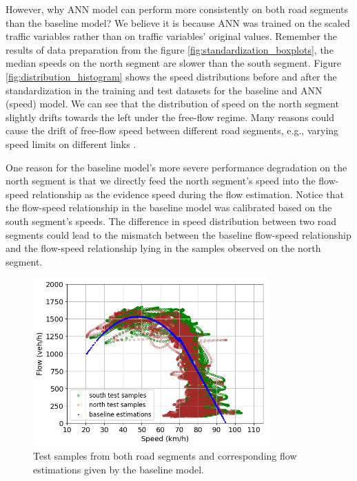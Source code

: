 \documentclass[english]{kththesis}
\begin{document}
However, why ANN model can perform more consistently on both road segments than the baseline model? We believe it is because ANN was trained on the scaled traffic variables rather than on traffic variables' original values. Remember the results of data preparation from the figure \ref{fig:standardization_boxplots}, the median speeds on the north segment are slower than the south segment. Figure \ref{fig:distribution_histogram} shows the speed distributions before and after the standardization in the training and test datasets for the baseline and ANN (speed) model. We can see that the distribution of speed on the north segment slightly drifts towards the left under the free-flow regime. Many reasons could cause the drift of free-flow speed between different road segments, e.g., varying speed limits on different links \cite{neumann_bayesian}.


One reason for the baseline model's more severe performance degradation on the north segment is that we directly feed the north segment's speed into the flow-speed relationship as the evidence speed during the flow estimation. Notice that the flow-speed relationship in the baseline model was calibrated based on the south segment's speeds. The difference in speed distribution between two road segments could lead to the mismatch between the baseline flow-speed relationship and the flow-speed relationship lying in the samples observed on the north segment.

\begin{figure}[!ht]
    \centering
    \includegraphics[width=0.8\textwidth]{relation_shift_baseline.png}
    \caption{Test samples from both road segments and corresponding flow estimations given by the baseline model.}
    \label{fig:relation_shift_baseline}
\end{figure}
\end{document}
